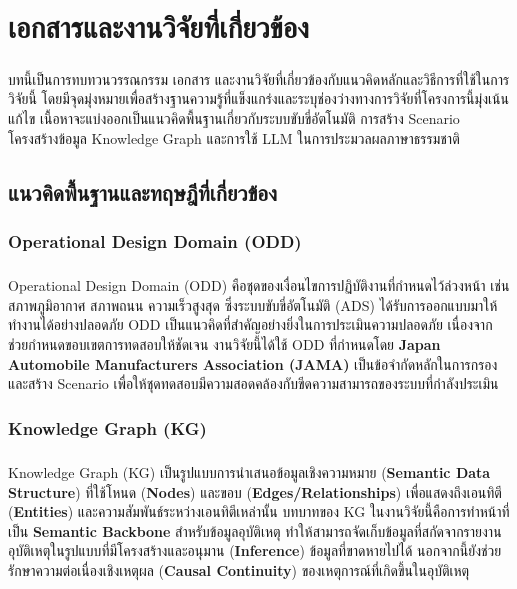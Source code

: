 \chapter{เอกสารและงานวิจัยที่เกี่ยวข้อง}

\paragraph{}
บทนี้เป็นการทบทวนวรรณกรรม เอกสาร และงานวิจัยที่เกี่ยวข้องกับแนวคิดหลักและวิธีการที่ใช้ในการวิจัยนี้ โดยมีจุดมุ่งหมายเพื่อสร้างฐานความรู้ที่แข็งแกร่งและระบุช่องว่างทางการวิจัยที่โครงการนี้มุ่งเน้นแก้ไข เนื้อหาจะแบ่งออกเป็นแนวคิดพื้นฐานเกี่ยวกับระบบขับขี่อัตโนมัติ การสร้าง Scenario โครงสร้างข้อมูล Knowledge Graph และการใช้ LLM ในการประมวลผลภาษาธรรมชาติ

\section{แนวคิดพื้นฐานและทฤษฎีที่เกี่ยวข้อง}

\subsection{Operational Design Domain (ODD)}\label{sec:ODD}
\paragraph{}
Operational Design Domain (ODD) คือชุดของเงื่อนไขการปฏิบัติงานที่กำหนดไว้ล่วงหน้า เช่น สภาพภูมิอากาศ สภาพถนน ความเร็วสูงสุด ซึ่งระบบขับขี่อัตโนมัติ (ADS) ได้รับการออกแบบมาให้ทำงานได้อย่างปลอดภัย ODD เป็นแนวคิดที่สำคัญอย่างยิ่งในการประเมินความปลอดภัย เนื่องจากช่วยกำหนดขอบเขตการทดสอบให้ชัดเจน งานวิจัยนี้ได้ใช้ ODD ที่กำหนดโดย \textbf{Japan Automobile Manufacturers Association (JAMA)} เป็นข้อจำกัดหลักในการกรองและสร้าง Scenario เพื่อให้ชุดทดสอบมีความสอดคล้องกับขีดความสามารถของระบบที่กำลังประเมิน

\subsection{Knowledge Graph (KG)}\label{sec:KG}
\paragraph{}
Knowledge Graph (KG) เป็นรูปแบบการนำเสนอข้อมูลเชิงความหมาย (\textbf{Semantic Data Structure}) ที่ใช้โหนด (\textbf{Nodes}) และขอบ (\textbf{Edges/Relationships}) เพื่อแสดงถึงเอนทิตี (\textbf{Entities}) และความสัมพันธ์ระหว่างเอนทิตีเหล่านั้น บทบาทของ KG ในงานวิจัยนี้คือการทำหน้าที่เป็น \textbf{Semantic Backbone} สำหรับข้อมูลอุบัติเหตุ ทำให้สามารถจัดเก็บข้อมูลที่สกัดจากรายงานอุบัติเหตุในรูปแบบที่มีโครงสร้างและอนุมาน (\textbf{Inference}) ข้อมูลที่ขาดหายไปได้ นอกจากนี้ยังช่วยรักษาความต่อเนื่องเชิงเหตุผล (\textbf{Causal Continuity}) ของเหตุการณ์ที่เกิดขึ้นในอุบัติเหตุ

